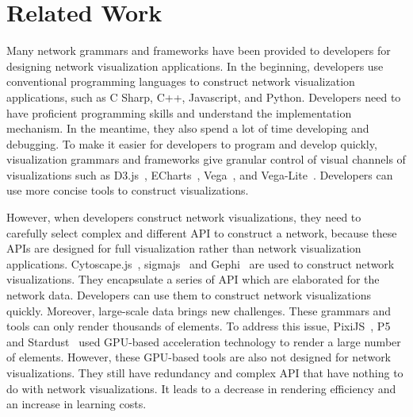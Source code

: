 \section{Related Work}

Many network grammars and frameworks have been provided to developers for designing network visualization applications.
In the beginning, developers use conventional programming languages to construct network visualization applications, such as C Sharp, C++, Javascript, and Python. Developers need to have proficient programming skills and understand the implementation mechanism.
In the meantime, they also spend a lot of time developing and debugging. To make it easier for developers to program and develop quickly, visualization grammars and frameworks give granular control of visual channels of visualizations such as D3.js~\cite{DBLP:journals/tvcg/BostockOH11}, ECharts~\cite{DBLP:journals/vi/LiMSSZWZC18}, Vega~\cite{DBLP:journals/tvcg/SatyanarayanRHH16}, and Vega-Lite~\cite{DBLP:journals/tvcg/SatyanarayanMWH17}. Developers can use more concise tools to construct visualizations.


However, when developers construct network visualizations, they need to carefully select complex and different API to construct a network, because these APIs are designed for full visualization rather than network visualization applications. Cytoscape.js~\cite{DBLP:journals/bioinformatics/FranzLHDSB16}, sigmajs~\cite{DBLP:journals/jossw/Coene18} and Gephi~\cite{DBLP:conf/icwsm/BastianHJ09} are used to construct network visualizations. They encapsulate a series of API which are elaborated for the network data. Developers can use them to construct network visualizations quickly.
Moreover, large-scale data brings new challenges. These grammars and tools can only render thousands of elements. To address this issue, PixiJS~\cite{graphicslearn}, P5~\cite{DBLP:journals/tvcg/LiM20} and Stardust~\cite{DBLP:journals/cgf/RenLH17} used GPU-based acceleration technology to render a large number of elements.
However, these GPU-based tools are also not designed for network visualizations.
They still have redundancy and complex API that have nothing to do with network visualizations. It leads to a decrease in rendering efficiency and an increase in learning costs.

